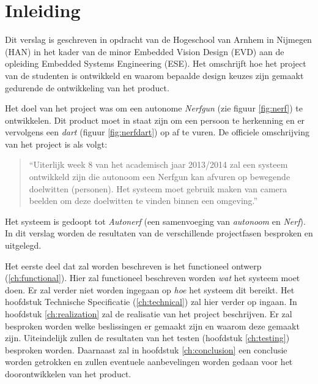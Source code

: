 \chapter{Inleiding}
\label{ch:introduction}

Dit verslag is geschreven in opdracht van de Hogeschool van Arnhem in Nijmegen
(HAN) in het kader van de minor Embedded Vision Design (EVD) aan de opleiding
Embedded Systems Engineering (ESE). Het omschrijft hoe het project van de studenten
is ontwikkeld en waarom bepaalde design keuzes zijn gemaakt gedurende de
ontwikkeling van het product.

Het doel van het project was om een autonome \emph{Nerfgun} (zie figuur \ref{fig:nerf})
te ontwikkelen. Dit product moet in staat zijn om een persoon te herkenning
en er vervolgens een \emph{dart} (figuur \ref{fig:nerfdart}) op af te vuren. De
officiele omschrijving van het project is als volgt:

\begin{quote}
“Uiterlijk week 8 van het academisch jaar 2013/2014 zal een systeem ontwikkeld zijn die
autonoom een Nerfgun kan afvuren op bewegende doelwitten (personen). Het systeem moet
gebruik maken van camera beelden om deze doelwitten te vinden binnen een omgeving.”
\end{quote}

Het systeem is gedoopt tot \emph{Autonerf} (een samenvoeging van \emph{autonoom}
en \emph{Nerf}). In dit verslag worden de resultaten van de verschillende projectfasen besproken
en uitgelegd.

\vfill
\pagebreak

Het eerste deel dat zal worden beschreven is het functioneel ontwerp
(\ref{ch:functional}). Hier zal functioneel beschreven worden \emph{wat} het
systeem moet doen. Er zal verder niet worden ingegaan op \emph{hoe} het systeem
dit bereikt. Het hoofdstuk Technische Specificatie (\ref{ch:technical}) zal hier
verder op ingaan. In hoofdstuk \ref{ch:realization} zal de realisatie van het
project beschrijven. Er zal besproken worden welke beslissingen er gemaakt zijn
en waarom deze gemaakt zijn. Uiteindelijk zullen de resultaten van het testen
(hoofdstuk \ref{ch:testing}) besproken worden. Daarnaast zal in hoofdstuk
\ref{ch:conclusion} een conclusie worden getrokken en zullen eventuele
aanbevelingen worden gedaan voor het doorontwikkelen van het product.

